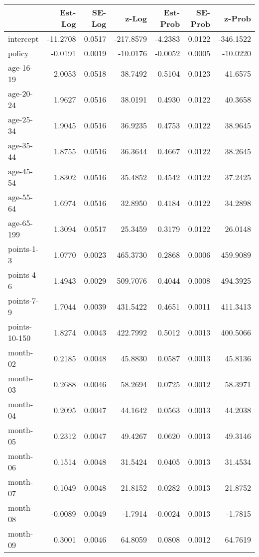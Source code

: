 \documentclass[10pt]{article}
\begin{document}
\begin{table}[ht]
\centering
\begin{tabular}{lrrrrrr}
  \hline
 & Est-Log & SE-Log & z-Log & Est-Prob & SE-Prob & z-Prob \\ 
  \hline
intercept & -11.2708 & 0.0517 & -217.8579 & -4.2383 & 0.0122 & -346.1522 \\ 
  policy & -0.0191 & 0.0019 & -10.0176 & -0.0052 & 0.0005 & -10.0220 \\ 
  age-16-19 & 2.0053 & 0.0518 & 38.7492 & 0.5104 & 0.0123 & 41.6575 \\ 
  age-20-24 & 1.9627 & 0.0516 & 38.0191 & 0.4930 & 0.0122 & 40.3658 \\ 
  age-25-34 & 1.9045 & 0.0516 & 36.9235 & 0.4753 & 0.0122 & 38.9645 \\ 
  age-35-44 & 1.8755 & 0.0516 & 36.3644 & 0.4667 & 0.0122 & 38.2645 \\ 
  age-45-54 & 1.8302 & 0.0516 & 35.4852 & 0.4542 & 0.0122 & 37.2425 \\ 
  age-55-64 & 1.6974 & 0.0516 & 32.8950 & 0.4184 & 0.0122 & 34.2898 \\ 
  age-65-199 & 1.3094 & 0.0517 & 25.3459 & 0.3179 & 0.0122 & 26.0148 \\ 
  points-1-3 & 1.0770 & 0.0023 & 465.3730 & 0.2868 & 0.0006 & 459.9089 \\ 
  points-4-6 & 1.4943 & 0.0029 & 509.7076 & 0.4044 & 0.0008 & 494.3925 \\ 
  points-7-9 & 1.7044 & 0.0039 & 431.5422 & 0.4651 & 0.0011 & 411.3413 \\ 
  points-10-150 & 1.8274 & 0.0043 & 422.7992 & 0.5012 & 0.0013 & 400.5066 \\ 
  month-02 & 0.2185 & 0.0048 & 45.8830 & 0.0587 & 0.0013 & 45.8136 \\ 
  month-03 & 0.2688 & 0.0046 & 58.2694 & 0.0725 & 0.0012 & 58.3971 \\ 
  month-04 & 0.2095 & 0.0047 & 44.1642 & 0.0563 & 0.0013 & 44.2038 \\ 
  month-05 & 0.2312 & 0.0047 & 49.4267 & 0.0620 & 0.0013 & 49.3146 \\ 
  month-06 & 0.1514 & 0.0048 & 31.5424 & 0.0405 & 0.0013 & 31.4534 \\ 
  month-07 & 0.1049 & 0.0048 & 21.8152 & 0.0282 & 0.0013 & 21.8752 \\ 
  month-08 & -0.0089 & 0.0049 & -1.7914 & -0.0024 & 0.0013 & -1.7815 \\ 
  month-09 & 0.3001 & 0.0046 & 64.8059 & 0.0808 & 0.0012 & 64.7619 \\ 

\end{tabular}
\end{table}
\end{document}
